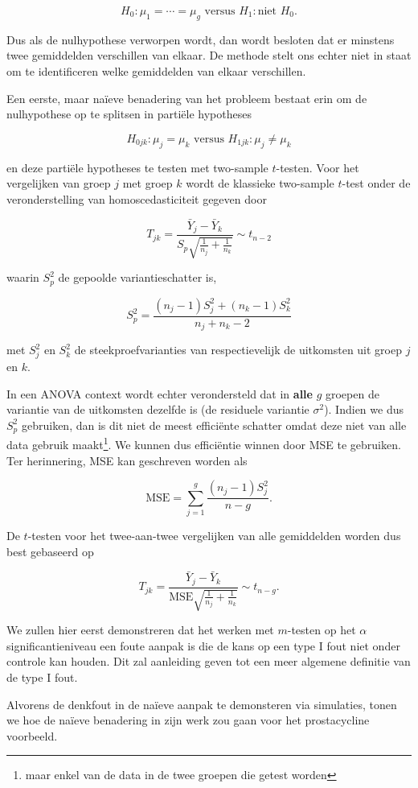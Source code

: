 \documentclass[
  12pt,dutch,coursenotes]{book}
\begin{document}
\[  H_0: \mu_1=\cdots = \mu_g \text{ versus } H_1: \text{niet } H_0.\]

Dus als de nulhypothese verworpen wordt, dan wordt besloten dat er minstens twee gemiddelden verschillen van elkaar. De methode stelt ons echter niet in staat om te identificeren welke gemiddelden van elkaar verschillen.

Een eerste, maar naïeve benadering van het probleem bestaat erin om de nulhypothese op te splitsen in partiële hypotheses

\[H_{0jk}: \mu_j=\mu_k \text{ versus } H_{1jk}: \mu_j \neq \mu_k\]

en deze partiële hypotheses te testen met two-sample \(t\)-testen. Voor het vergelijken van groep \(j\) met groep \(k\) wordt de klassieke two-sample \(t\)-test onder de veronderstelling van homoscedasticiteit gegeven door

\[T_{jk} = \frac{\bar{Y}_j-\bar{Y}_k}{S_p\sqrt{\frac{1}{n_j}+\frac{1}{n_k}}} \sim t_{n-2}\]

waarin \(S_p^2\) de gepoolde variantieschatter is,

\[S_p^2 = \frac{(n_j-1)S_j^2 + (n_k-1)S_k^2}{n_j+n_k-2}\]

met \(S_j^2\) en \(S_k^2\) de steekproefvarianties van respectievelijk de uitkomsten uit groep \(j\) en \(k\).

In een ANOVA context wordt echter verondersteld dat in \textbf{alle} \(g\) groepen de variantie van de uitkomsten dezelfde is (de residuele variantie \(\sigma^2\)). Indien we dus \(S_p^2\) gebruiken, dan is dit niet de meest efficiënte schatter omdat deze niet van alle data gebruik maakt\footnote{maar enkel van de data in de twee groepen die getest worden}. We kunnen dus efficiëntie winnen door MSE te gebruiken. Ter herinnering, MSE kan geschreven worden als

\[\text{MSE}= \sum_{j=1}^g \frac{(n_j-1)S_j^2}{n-g}.\]

De \(t\)-testen voor het twee-aan-twee vergelijken van alle gemiddelden worden dus best gebaseerd op

\[T_{jk} = \frac{\bar{Y}_j-\bar{Y}_k}{\text{MSE}\sqrt{\frac{1}{n_j}+\frac{1}{n_k}}} \sim t_{n-g}.\]

We zullen hier eerst demonstreren dat het werken met \(m\)-testen op het \(\alpha\) significantieniveau een foute aanpak is die de kans op een type I fout niet onder controle kan houden. Dit zal aanleiding geven tot een meer algemene definitie van de type I fout.

Alvorens de denkfout in de naïeve aanpak te demonsteren via simulaties, tonen we hoe de naïeve benadering in zijn werk zou gaan voor het prostacycline voorbeeld.
\end{document}
